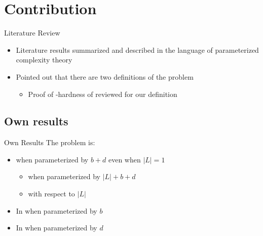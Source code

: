 \section{Contribution}

\begin{frame}{Literature Review}
    \begin{itemize}
        \item Literature results summarized and described in the language of parameterized complexity theory
        \item Pointed out that there are two definitions of the problem
        \begin{itemize}
            \item Proof of \NP-hardness of \HLdeg reviewed for our definition 
        \end{itemize}
    \end{itemize}
\end{frame}

\subsection
{Own results}

\begin{frame}{Own Results}
    The \HL problem is:
    \begin{itemize}
        \item \Wh when parameterized by $b+d$ even when $|L|=1$
        \begin{itemize}
            \item \Wh when parameterized by $|L|+b+d$
            \item \pNPh with respect to $|L|$
        \end{itemize}
        \item In \XP when parameterized by $b$
        \item In \XP when parameterized by $d$
    \end{itemize}
\end{frame}

